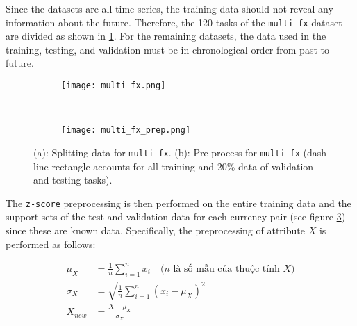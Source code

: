 
Since the datasets are all time-series, the training data should not reveal any information about the future. Therefore, the 120 tasks of the \verb|multi-fx| dataset are divided as shown in \ref{fig:multi_fx_split}. For the remaining datasets, the data used in the training, testing, and validation must be in chronological order from past to future.

\begin{figure}[H]
    \centering
    \begin{subfigure}[b]{0.5\textwidth}
        \centering
        \texttt{[image: multi\_fx.png]}
        \caption{}
        \label{fig:multi_fx_split}
    \end{subfigure}%
    ~
    \begin{subfigure}[b]{0.5\textwidth}
        \centering
        \texttt{[image: multi\_fx\_prep.png]}
        \caption{}
        \label{fig:multi_fx_prep}
    \end{subfigure}

    \cprotect\caption{(a): Splitting data for \verb|multi-fx|. (b): Pre-process for \verb|multi-fx| (dash line rectangle accounts for all training and 20\% data of validation and testing tasks).}
\end{figure}


The \verb|z-score| preprocessing is then performed on the entire training data and the support sets of the test and validation data for each currency pair (see figure \ref{fig:multi_fx_prep}) since these are known data. Specifically, the preprocessing of attribute $X$ is performed as follows:

\begin{align}
    \mu_{X} &= \frac{1}{n} \sum_{i=1}^n{x_i} \quad \text{($n$ là số mẫu của thuộc tính $X$)} \label{eq:mean}\\
    \sigma_{X} &= \sqrt{\frac{1}{n} \sum_{i=1}^n{(x_i - \mu_X)^2}} \label{eq:std}\\
    X_{new} &= \frac{X - \mu_{X}}{\sigma_{X}} \label{eq:z_score}
\end{align}

